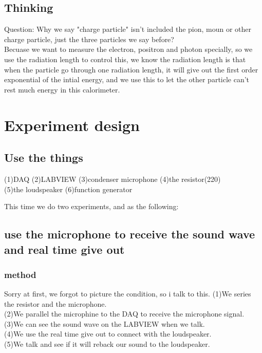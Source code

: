 \documentclass[12pt]{article}
\begin{document}
\subsection{Thinking}
Question: Why we say "charge particle" isn't included the pion, moun or other charge particle, just the three particles we say before?\\
Becuase we want to measure the electron, positron and photon specially, so we use the radiation length to control this, we know the radiation length is that when the particle go through one radiation length, it will give out the first order exponential of the intial energy, and we use this to let the other particle can't rest much energy in this calorimeter.

 




\section{Experiment design}
\subsection{Use the things}

(1)DAQ (2)LABVIEW (3)condenser microphone (4)the resistor(220)\\
(5)the loudspeaker (6)function generator



This time we do two experiments, and as the following:

\subsection{use the microphone to receive the sound wave and real time give out}

\subsubsection{method}
Sorry at first, we forgot to picture the condition, so i talk to this.
(1)We series the resistor and the microphone.\\
(2)We parallel the microphine to the DAQ to receive the microphone signal.\\
(3)We can see the sound wave on the LABVIEW when we talk.\\
(4)We use the real time give out to connect with the loudspeaker.\\
(5)We talk and see if it will reback our sound to the loudspeaker.\\
\end{document}
